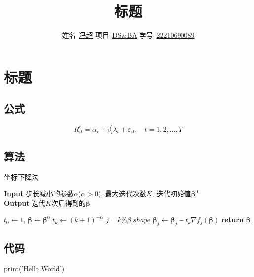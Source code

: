 \documentclass[hyperref,a4paper,UTF8]{ctexart}
\title{\textbf{{标题}}}
\author{
  \kaishu\normalsize
  姓名\ \underline{冯超} \qquad
  项目\ \underline{DS\&BA} \qquad
  学号\ \underline{22210690089}
}
\date{} %
\begin{document}
\maketitle

\tableofcontents

\section{标题}

\subsection{公式}

$$
    R_{it}^e =\alpha_i+\beta_i ^\prime \lambda_t+\varepsilon_{it},\quad t=1,2,\dots, T
$$

\subsection{算法}

\begin{algorithm}[H]
    \caption{坐标下降法}\label{坐标下降法}
    \hspace*{\algorithmicindent} \textbf{Input} 步长减小的参数$\alpha$($\alpha>0$), 最大迭代次数$K$, 迭代初始值$\boldsymbol{\beta}^0$\\
    \hspace*{\algorithmicindent} \textbf{Output} 迭代$K$次后得到的$\boldsymbol{\beta}$
    \begin{algorithmic}[1]
        \State $t_0 \leftarrow 1$, $\boldsymbol{\beta} \leftarrow \boldsymbol{\beta}^0$
        \State $t_k \leftarrow (k+1) ^{-\alpha}$
        \State $j = k \% \beta.shape$ 
        \State $\boldsymbol{\beta}_{j} \leftarrow \boldsymbol{\beta}_{j}-t_k \nabla f_j(\boldsymbol{\beta})$
        \EndFor
        \State \textbf{return} $\boldsymbol{\beta}$
        \EndFunction
    \end{algorithmic}
\end{algorithm}

\subsection{代码}

\begin{python}
    print('Hello World')
\end{python}
\end{document}

